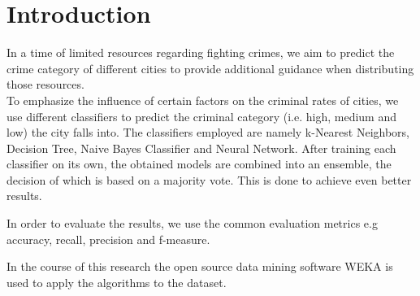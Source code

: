 \section{Introduction}

In a time of limited resources regarding fighting crimes, we aim to predict the crime category of different
cities to provide additional guidance when distributing those resources. \\

\noindent To emphasize the influence of certain factors on the criminal rates of cities, we use different
classifiers to predict the criminal category (i.e. high, medium and low) the city falls into. The classifiers
employed are namely k-Nearest Neighbors, Decision Tree, Naive Bayes Classifier and Neural Network.
After training each classifier on its own, the obtained models are combined into an ensemble, the decision of
which is based on a majority vote. This is done to achieve even better results. 

In order to evaluate the results, we use the common evaluation metrics e.g accuracy, recall, precision and
f-measure.

In the course of this research the open source data mining software WEKA is used to apply the algorithms to
the dataset.

\vspace*{\fill}
